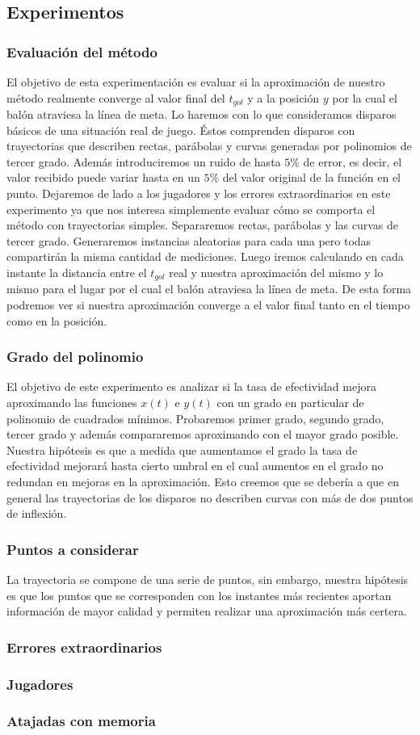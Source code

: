 \subsection{Experimentos}

\subsubsection{Evaluación del método}
El objetivo de esta experimentación es evaluar si la aproximación de nuestro método realmente converge al valor final del $t_{gol}$ y a 
la posición $y$ por la cual el balón atraviesa la línea de meta. Lo haremos con lo que consideramos disparos básicos de una situación
real de juego. Éstos comprenden disparos con trayectorias que describen rectas, parábolas y curvas generadas por polinomios de tercer
grado. Además introduciremos un ruido de hasta $5\%$ de error, es decir, el valor recibido puede variar hasta en un $5\%$ del valor
original de la función en el punto. Dejaremos de lado a los jugadores y los errores extraordinarios en este experimento ya que nos interesa
simplemente evaluar cómo se comporta el método con trayectorias simples.
Separaremos rectas, parábolas y las curvas de tercer grado. Generaremos instancias aleatorias para cada una pero todas compartirán la misma
cantidad de mediciones. Luego iremos calculando en cada instante la distancia entre el $t_{gol}$ real y nuestra aproximación del mismo y lo
mismo para el lugar por el cual el balón atraviesa la línea de meta. De esta forma podremos ver si nuestra aproximación converge a el
valor final tanto en el tiempo como en la posición.

\subsubsection{Grado del polinomio}
El objetivo de este experimento es analizar si la tasa de efectividad mejora aproximando las funciones $x(t)$ e $y(t)$ con un grado en 
particular de polinomio de cuadrados mínimos. Probaremos primer grado, segundo grado, tercer grado y además compararemos aproximando
con el mayor grado posible. Nuestra hipótesis es que a medida que aumentamos el grado la tasa de efectividad mejorará hasta cierto umbral en 
el cual aumentos en el grado no redundan en mejoras en la aproximación. Esto creemos que se debería a que en general las trayectorias de los 
disparos no describen curvas con más de dos puntos de inflexión.

\subsubsection{Puntos a considerar}
La trayectoria se compone de una serie de puntos, sin embargo, nuestra hipótesis es que los puntos que se corresponden con los instantes más
recientes aportan información de mayor calidad y permiten realizar una aproximación más certera. 


\subsubsection{Errores extraordinarios}


\subsubsection{Jugadores}

\subsubsection{Atajadas con memoria}
